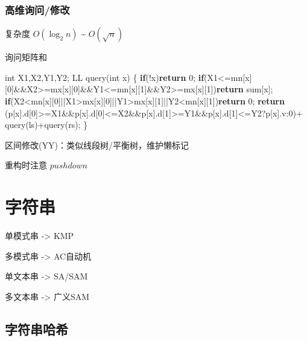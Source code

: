 \documentclass[
]{article}
\newenvironment{Shaded}{}{}
\newcommand{\ControlFlowTok}[1]{\textcolor[rgb]{0.00,0.44,0.13}{\textbf{#1}}}
\newcommand{\DataTypeTok}[1]{\textcolor[rgb]{0.56,0.13,0.00}{#1}}
\newcommand{\DecValTok}[1]{\textcolor[rgb]{0.25,0.63,0.44}{#1}}
\newcommand{\NormalTok}[1]{#1}
\begin{document}
\hypertarget{ux9ad8ux7ef4ux8be2ux95eeux4feeux6539}{%
\subsubsection{高维询问/修改}\label{ux9ad8ux7ef4ux8be2ux95eeux4feeux6539}}

复杂度 \(O(\log_{2}{n})\) \textasciitilde{} \(O(\sqrt{n})\)

询问矩阵和

\begin{Shaded}
\begin{Highlighting}[]
\DataTypeTok{int}\NormalTok{ X1,X2,Y1,Y2;}
\NormalTok{LL query(}\DataTypeTok{int}\NormalTok{ x)}
\NormalTok{\{}
    \ControlFlowTok{if}\NormalTok{(!x)}\ControlFlowTok{return} \DecValTok{0}\NormalTok{;}
    \ControlFlowTok{if}\NormalTok{(X1\textless{}=mn[x][}\DecValTok{0}\NormalTok{]\&\&X2\textgreater{}=mx[x][}\DecValTok{0}\NormalTok{]\&\&Y1\textless{}=mn[x][}\DecValTok{1}\NormalTok{]\&\&Y2\textgreater{}=mx[x][}\DecValTok{1}\NormalTok{])}\ControlFlowTok{return}\NormalTok{ sum[x];}
    \ControlFlowTok{if}\NormalTok{(X2\textless{}mn[x][}\DecValTok{0}\NormalTok{]||X1\textgreater{}mx[x][}\DecValTok{0}\NormalTok{]||Y1\textgreater{}mx[x][}\DecValTok{1}\NormalTok{]||Y2\textless{}mn[x][}\DecValTok{1}\NormalTok{])}\ControlFlowTok{return} \DecValTok{0}\NormalTok{;}
    \ControlFlowTok{return}\NormalTok{ (p[x].d[}\DecValTok{0}\NormalTok{]\textgreater{}=X1\&\&p[x].d[}\DecValTok{0}\NormalTok{]\textless{}=X2\&\&p[x].d[}\DecValTok{1}\NormalTok{]\textgreater{}=Y1\&\&p[x].d[}\DecValTok{1}\NormalTok{]\textless{}=Y2?p[x].v:}\DecValTok{0}\NormalTok{)+}
\NormalTok{        query(ls)+query(rs);}
\NormalTok{\}}
\end{Highlighting}
\end{Shaded}

区间修改(YY)：类似线段树/平衡树，维护懒标记

重构时注意 \(pushdown\)

\hypertarget{ux5b57ux7b26ux4e32}{%
\section{字符串}\label{ux5b57ux7b26ux4e32}}

单模式串 -\textgreater{} KMP

多模式串 -\textgreater{} AC自动机

单文本串 -\textgreater{} SA/SAM

多文本串 -\textgreater{} 广义SAM

\hypertarget{ux5b57ux7b26ux4e32ux54c8ux5e0c}{%
\subsection{字符串哈希}\label{ux5b57ux7b26ux4e32ux54c8ux5e0c}}
\end{document}
